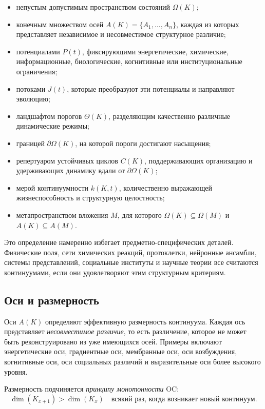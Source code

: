 \begin{itemize}
    \item непустым допустимым пространством состояний \(\Omega(K)\);
    \item конечным множеством осей \(A(K)=\{A_1,\dots,A_n\}\), каждая из которых представляет независимое и несовместимое структурное различие;
    \item потенциалами \(P(t)\), фиксирующими энергетические, химические, информационные, биологические, когнитивные или институциональные ограничения;
    \item потоками \(J(t)\), которые преобразуют эти потенциалы и направляют эволюцию;
    \item ландшафтом порогов \(\Theta(K)\), разделяющим качественно различные динамические режимы;
    \item границей \(\partial\Omega(K)\), на которой пороги достигают насыщения;
    \item репертуаром устойчивых циклов \(C(K)\), поддерживающих организацию и удерживающих динамику вдали от \(\partial\Omega(K)\);
    \item мерой континуумности \(k(K,t)\), количественно выражающей жизнеспособность и структурную целостность;
    \item метапространством вложения \(M\), для которого \(\Omega(K)\subseteq\Omega(M)\) и \(A(K)\subseteq A(M)\).
\end{itemize}

Это определение намеренно избегает предметно-специфических деталей.
Физические поля, сети химических реакций, протоклетки, нейронные ансамбли, системы представлений, социальные институты и научные теории все считаются континуумами, если они удовлетворяют этим структурным критериям.

\subsection{Оси и размерность}

Оси \(A(K)\) определяют эффективную размерность континуума.
Каждая ось представляет \emph{несовместимое различие}, то есть различение, которое не может быть реконструировано из уже имеющихся осей.
Примеры включают энергетические оси, градиентные оси, мембранные оси, оси возбуждения, когнитивные оси, оси социальных различий и выразительные оси более высокого уровня.

Размерность подчиняется \emph{принципу монотонности} OC:
\[
\dim(K_{x+1}) > \dim(K_x)
\quad\text{всякий раз, когда возникает новый континуум}.
\]

